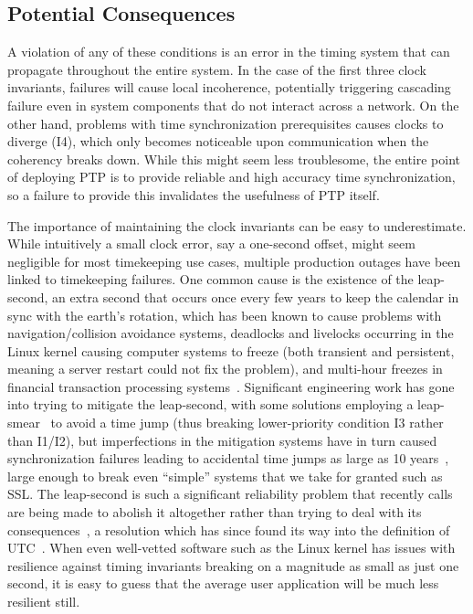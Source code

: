 \subsection{Potential Consequences}
A violation of any of these conditions is an error in the timing system that can propagate throughout the entire system.
In the case of the first three clock invariants, failures will cause local incoherence, potentially triggering cascading failure even in system components that do not interact across a network. On the other hand, problems with time synchronization prerequisites causes clocks to diverge (I4), which only becomes noticeable upon communication when the coherency breaks down.
While this might seem less troublesome, the entire point of deploying PTP is to provide reliable and high accuracy time synchronization, so a failure to provide this invalidates the usefulness of PTP itself.

The importance of maintaining the clock invariants can be easy to underestimate. While intuitively a small clock error, say a one-second offset, might seem negligible for most timekeeping use cases, multiple production outages have been linked to timekeeping failures. One common cause is the existence of the leap-second, an extra second that occurs once every few years to keep the calendar in sync with the earth's rotation, which has been known to cause problems with navigation/collision avoidance systems, deadlocks and livelocks occurring in the Linux kernel causing computer systems to freeze (both transient and persistent, meaning a server restart could not fix the problem), and multi-hour freezes in financial transaction processing systems~\cite{leap-seconds-recap}. Significant engineering work has gone into trying to mitigate the leap-second, with some solutions employing a leap-smear~\cite{leap-second-google, leap-second-technical-aspects} to avoid a time jump (thus breaking lower-priority condition I3 rather than I1/I2), but imperfections in the mitigation systems have in turn caused synchronization failures leading to accidental time jumps as large as 10 years~\cite{leap-seconds-recap}, large enough to break even ``simple'' systems that we take for granted such as SSL. The leap-second is such a significant reliability problem that recently calls are being made to abolish it altogether rather than trying to deal with its consequences~\cite{leap-second-facebook-abolish}, a resolution which has since found its way into the definition of UTC~\cite{leap-second-resolution}. When even well-vetted software such as the Linux kernel has issues with resilience against timing invariants breaking on a magnitude as small as just one second, it is easy to guess that the average user application will be much less resilient still.

